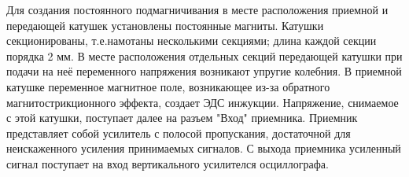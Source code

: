 Для создания постоянного подмагничивания в месте расположения приемной и передающей катушек установлены постоянные магниты. Катушки секционированы, т.е.намотаны несколькими секциями; длина каждой секции порядка 2 мм. В месте расположения отдельных секций передающей катушки при подачи на неё переменного напряжения возникают упругие колебния. В приемной катушке переменное магнитное поле, возникающее из-за обратного магнитострикционного эффекта, создает ЭДС инжукции. Напряжение, снимаемое с этой катушки, поступает далее на разъем "Вход" приемника. Приемник представляет собой усилитель с полосой пропускания, достаточной для неискаженного усиления принимаемых сигналов. С выхода приемника усиленный сигнал поступает на вход вертикального усилителся осциллографа.



 